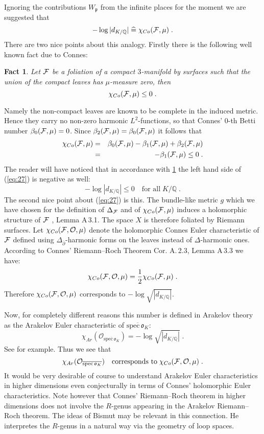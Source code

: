 \documentclass[11pt,leqno]{article}
\newcommand{\Q}{{\mathbb{Q}}}
\newcommand{\spec}{\mathrm{spec}\,}
\newcommand{\Fh}{{\cal F}}
\newcommand{\Oh}{\mathcal{O}}
\newcommand{\eo}{\mathfrak{o}}
\newcommand{\ep}{\mathfrak{p}}
\newcommand{\ent}{\;\widehat{=}\;}
\newcommand{\halb}{\frac{1}{2}}
\newtheorem{fact}[theorem]{Fact}
\begin{document}
Ignoring the contributions $W_{\ep}$ from the infinite places for the moment we are suggested that
\begin{equation}
  \label{eq:27}
  - \log |d_{K/ \Q}| \ent \chi_{Co} (\Fh , \mu) \; .
\end{equation}
There are two nice points about this analogy. Firstly there is the following well known fact due to Connes: 

\begin{fact}
  \label{t10}
Let $\Fh$ be a foliation of a compact $3$-manifold by surfaces such that the union of the compact leaves has $\mu$-measure zero, then
\[
\chi_{Co} (\Fh , \mu) \le 0 \; .
\]
\end{fact}
Namely the non-compact leaves are known to be complete in the induced metric. Hence they carry no non-zero harmonic $L^2$-functions, so that Connes' $0$-th Betti number $\beta_0 (\Fh , \mu) = 0$. Since $\beta_2 (\Fh , \mu) = \beta_0 (\Fh , \mu)$ it follows that
\begin{eqnarray*}
  \chi_{Co} (\Fh , \mu) & = & \beta_0 (\Fh , \mu) - \beta_1 (\Fh , \mu) + \beta_2 (\Fh , \mu) \\
& = & - \beta_1 (\Fh , \mu) \le 0 \; .
\end{eqnarray*}
The reader will have noticed that in accordance with \ref{t10} the left hand side of (\ref{eq:27}) is negative as well:
\[
- \log |d_{K / \Q}| \le 0 \quad \mbox{for all} \;  K / \Q \; .
\]
The second nice point about (\ref{eq:27}) is this. The bundle-like metric $g$ which we have chosen for the definition of $\Delta_{\Fh}$ and of $\chi_{Co} (\Fh , \mu)$ induces a holomorphic structure of $\Fh$ \cite{MS}, Lemma A\,3.1. The space $X$ is therefore foliated by Riemann surfaces. Let $\chi_{Co} (\Fh , \Oh , \mu)$ denote the holomorphic Connes Euler characteristic of $\Fh$ defined using $\Delta_{\overline{\partial}}$-harmonic forms on the leaves instead of $\Delta$-harmonic ones. According to Connes' Riemann--Roch Theorem \cite{MS} Cor. A.\,2.3, Lemma A\,3.3 we have:
\[
\chi_{Co} (\Fh , \Oh , \mu) = \halb \chi_{Co} (\Fh , \mu) \; .
\]
Therefore $\chi_{Co} (\Fh , \Oh , \mu)$ corresponds to $-\log \sqrt{|d_{K / \Q}|}$. 

Now, for completely different reasons this number is defined in Arakelov theory as the Arakelov Euler characteristic of $\overline{\spec \eo_K}$:
\begin{equation}
  \label{eq:28}
  \chi_{Ar} (\Oh_{\overline{\spec \eo_K}}) = - \log {\textstyle \sqrt{|d_{K / \Q}|}} \; .
\end{equation}
See \cite{N} for example. Thus we see that
\[
\chi_{Ar} (\Oh_{\overline{\spec \eo_K}}) \quad \mbox{corresponds to} \; \chi_{Co} (\Fh , \Oh , \mu) \; .
\]
It would be very desirable of course to understand Arakelov Euler characteristics in higher dimensions even conjecturally in terms of Connes' holomorphic Euler characteristics. Note however that Connes' Riemann--Roch theorem in higher dimensions does not involve the $R$-genus appearing in the Arakelov Riemann--Roch theorem. The ideas of Bismut \cite{Bi} may be relevant in this connection. He interpretes the $R$-genus in a natural way via the geometry of loop spaces. 
\end{document}
